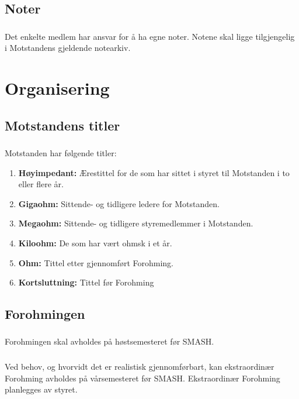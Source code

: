 \documentclass{article}
\newenvironment{statute}[1][]
    {
        \titleformat{\subsubsection}[runin]{\normalfont}{\hspace{1pt}\textit{\S\hspace{5pt}\thesubsubsection}}{0pt}{\rule{4pt}{0pt}}{}
        \subsubsection{}#1
        \begin{minipage}[t]{0.9\linewidth}
    }
    {
        \end{minipage}
        
        \ignorespacesafterend
    }
\begin{document}
        \subsection{Noter}
            \begin{statute}
                Det enkelte medlem har ansvar for å ha egne noter. Notene skal ligge tilgjengelig i Motstandens gjeldende notearkiv.
            \end{statute}
            
    \section{Organisering}
        \subsection{Motstandens titler}
            \begin{statute}
                Motstanden har følgende titler:
                \begin{enumerate}[font = \bfseries]
                    \item \textbf{Høyimpedant:} Ærestittel for de som har sittet i styret til Motstanden i to eller flere år.
                    \item \textbf{Gigaohm:} Sittende- og tidligere ledere for Motstanden.
                    \item \textbf{Megaohm:} Sittende- og tidligere styremedlemmer i Motstanden.
                    \item \textbf{Kiloohm:} De som har vært ohmsk i et år.
                    \item \textbf{Ohm:} Tittel etter gjennomført Forohming.
                    \item \textbf{Kortsluttning:} Tittel før Forohming
                \end{enumerate}
            \end{statute}
            
        \subsection{Forohmingen}     
             \begin{statute}
                Forohmingen skal avholdes på høstsemesteret før SMASH.
            \end{statute}
             \begin{statute}
                Ved behov, og hvorvidt det er realistisk gjennomførbart, kan ekstraordinær Forohming avholdes på vårsemesteret før SMASH. Ekstraordinær Forohming planlegges av styret.
             \end{statute}
             
\end{document}

